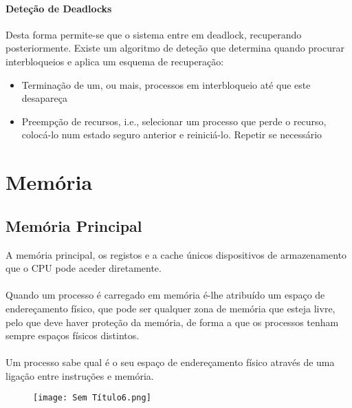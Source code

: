 \documentclass[10pt,a4paper]{report}
\begin{document}
\subsubsection{Deteção de Deadlocks}
Desta forma permite-se que o sistema entre em deadlock, recuperando posteriormente. Existe um algoritmo de deteção que determina quando procurar interbloqueios e aplica um esquema de recuperação:
\begin{itemize}
\item Terminação de um, ou mais, processos em interbloqueio até que este desapareça
\item Preempção de recursos, i.e., selecionar um processo que perde o recurso, colocá-lo num estado seguro anterior e reiniciá-lo. Repetir se necessário
\end{itemize}
\chapter{Memória}
\section{Memória Principal}
A memória principal, os registos e a cache únicos dispositivos de armazenamento que o CPU pode aceder diretamente.\\
\\
Quando um processo é carregado em memória é-lhe atribuído um espaço de endereçamento físico, que pode ser qualquer zona de memória que esteja livre, pelo que deve haver proteção da memória, de forma a que os processos tenham sempre espaços físicos distintos.\\
\\
Um processo sabe qual é o seu espaço de endereçamento físico através de uma ligação entre instruções e memória.
\begin{figure}[H]
\centering
\texttt{[image: Sem Título6.png]}
\end{figure}
\end{document}
